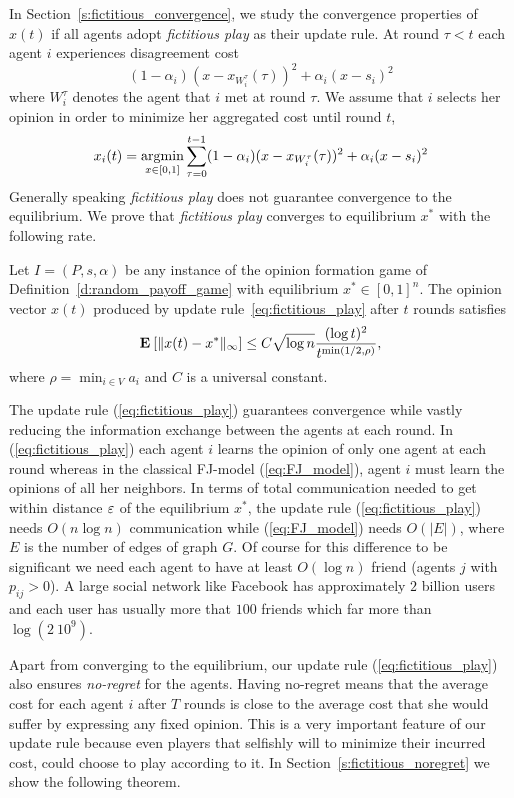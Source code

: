 In Section~\ref{s:fictitious_convergence}, we study the convergence properties of $x(t)$ if all agents adopt \emph{fictitious play}
as their update rule. At round $\tau < t$ each agent $i$ experiences disagreement cost 
\[(1-\alpha_i)(x-x_{W_i^\tau}(\tau))^2+\alpha_i(x-s_i)^2 \]where $W_i^\tau$
denotes the agent that $i$ met at round $\tau$. We assume that $i$ selects her opinion 
in order to minimize her aggregated cost until round $t$,
\begin{equation}\label{eq:fictitious_play}
x_i(t) =\operatorname*{argmin}_{x \in [0,1]}\sum_{\tau=0}^{t-1}(1-\alpha_i)(x-x_{W_i^\tau}(\tau))^2+\alpha_i(x-s_i)^2 
\end{equation}
\noindent Generally speaking \emph{fictitious play} does not guarantee
convergence to the equilibrium. We prove that \emph{fictitious play} 
converges to equilibrium $x^*$ with the following
rate.
\begin{theorem}\label{t:fictitious_convergence}
  Let $I = (P,s, \alpha)$ be any instance of the opinion formation
  game of Definition~\ref{d:random_payoff_game} with equilibrium
  $x^* \in [0,1]^n$.  The opinion vector $x(t)$ produced by
  update rule~\ref{eq:fictitious_play} after $t$ rounds satisfies
  \[
    \bm{\mathrm{E}}_{} \left[ \| x(t) - x^* \|_{\infty} \right] \leq
    C \sqrt{\log n}\frac{(\log t)^{2}}{t^{\min(1/2,\rho)}},
  \]
  where $\rho = \min_{i \in V} a_i$ and $C$ is a universal constant.
\end{theorem}
The update rule (\ref{eq:fictitious_play}) guarantees convergence
while vastly reducing the information exchange between the agents
at each round. In (\ref{eq:fictitious_play}) each agent $i$ learns the opinion of only one agent
at each round whereas in the classical FJ-model (\ref{eq:FJ_model}), agent $i$ must
learn the opinions of all her neighbors. In terms of
total communication needed to get within distance $\varepsilon$ of the
equilibrium $x^*$, the update rule (\ref{eq:fictitious_play}) needs
$O(n \log n)$ communication while (\ref{eq:FJ_model}) needs
$O(|E|)$, where $E$ is the number of edges of graph $G$. 
Of course for this difference to be significant we need
each agent to have at least $O(\log n)$ friend (agents $j$ with $p_{ij}>0$). A large social
network like Facebook has approximately $2$ billion users and each user
has usually more that $100$ friends which far more than $\log(2\ 10^9)$.

Apart from converging to the equilibrium, our update rule
(\ref{eq:fictitious_play}) also ensures \emph{no-regret} for the agents.
Having no-regret means that the average cost for each agent $i$
after $T$ rounds is close to the average cost that she would
suffer by expressing any fixed opinion. This is a very important
feature of our update rule because even players that selfishly
will to minimize their incurred cost, could choose to play according
to it. In Section~\ref{s:fictitious_noregret} we show the following
theorem.

